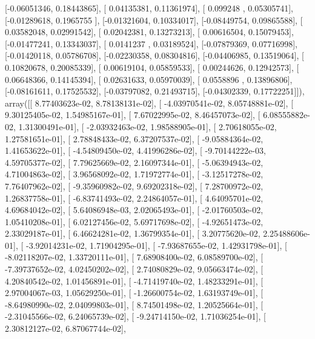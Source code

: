 \documentclass{article}
\begin{document}
       [-0.06051346,  0.18443865],
       [ 0.04135381,  0.11361974],
       [ 0.099248  ,  0.05305741],
       [-0.01289618,  0.1965755 ],
       [-0.01321604,  0.10334017],
       [-0.08449754,  0.09865588],
       [ 0.03582048,  0.02991542],
       [ 0.02042381,  0.13273213],
       [ 0.00616504,  0.15079453],
       [-0.01477241,  0.13343037],
       [ 0.0141237 ,  0.03189524],
       [-0.07879369,  0.07716998],
       [-0.01420118,  0.05786708],
       [-0.02230358,  0.08304816],
       [-0.04406985,  0.13519064],
       [ 0.10820678,  0.20085339],
       [ 0.00619104,  0.05859533],
       [ 0.00244626,  0.12942573],
       [ 0.06648366,  0.14145394],
       [ 0.02631633,  0.05970039],
       [ 0.0558896 ,  0.13896806],
       [-0.08161611,  0.17525532],
       [-0.03797082,  0.21493715],
       [-0.04302339,  0.17722251]]), array([[  8.77403623e-02,   8.78138131e-02],
       [ -4.03970541e-02,   8.05748881e-02],
       [  9.30125405e-02,   1.54985167e-01],
       [  7.67022995e-02,   8.46457073e-02],
       [  6.08555882e-02,   1.31300491e-01],
       [ -2.03932463e-02,   1.98588905e-01],
       [  2.70618055e-02,   1.27581651e-01],
       [  2.78848433e-02,   6.37207537e-02],
       [ -9.05884364e-02,   1.41653622e-01],
       [ -4.54809450e-02,   4.41996286e-02],
       [ -9.70144222e-03,   4.59705377e-02],
       [  7.79625669e-02,   2.16097344e-01],
       [ -5.06394943e-02,   4.71004863e-02],
       [  3.96568092e-02,   1.71972774e-01],
       [ -3.12517278e-02,   7.76407962e-02],
       [ -9.35960982e-02,   9.69202318e-02],
       [  7.28700972e-02,   1.26837758e-01],
       [ -6.83741493e-02,   2.24864057e-01],
       [  4.64095701e-02,   4.69684042e-02],
       [  5.64086948e-03,   2.02065493e-01],
       [ -2.01760503e-02,   1.05410208e-01],
       [  6.02127456e-02,   5.69717698e-02],
       [ -4.92651473e-02,   2.33029187e-01],
       [  6.46624281e-02,   1.36799354e-01],
       [  3.20775620e-02,   2.25488606e-01],
       [ -3.92014231e-02,   1.71904295e-01],
       [ -7.93687655e-02,   1.42931798e-01],
       [ -8.02118207e-02,   1.33720111e-01],
       [  7.68908400e-02,   6.08589700e-02],
       [ -7.39737652e-02,   4.02450202e-02],
       [  2.74080829e-02,   9.05663474e-02],
       [  4.20840542e-02,   1.01456891e-01],
       [ -4.71419740e-02,   1.48233291e-01],
       [  2.97004067e-03,   1.05629250e-01],
       [ -1.26600754e-02,   1.63193749e-01],
       [ -8.64980990e-02,   2.04099803e-01],
       [  8.74501498e-02,   1.20525664e-01],
       [ -2.31045566e-02,   6.24065739e-02],
       [ -9.24714150e-02,   1.71036254e-01],
       [  2.30812127e-02,   6.87067744e-02],
\end{document}
